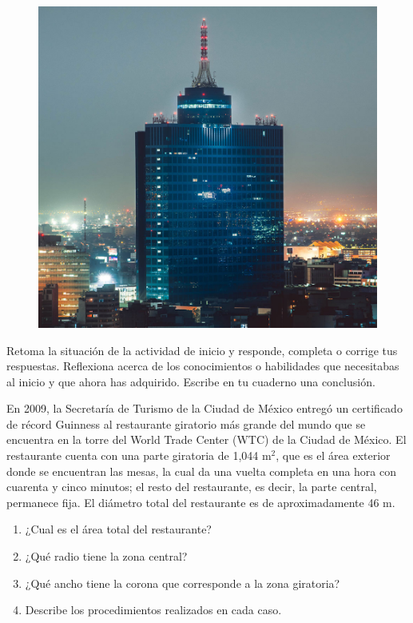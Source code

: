 \documentclass[11pt]{book}
\begin{document}
\begin{boxK}
  \begin{enumerate}
    \begin{minipage}[t]{0.25\textwidth}
      \begin{figure}[H]
        \centering
        \includegraphics[width=.8\linewidth]{wtc.jpg}
      \end{figure}
    \end{minipage}\hfill
    \begin{minipage}[t]{0.65\textwidth}
      \item Retoma la situación de la actividad de inicio y responde, completa o corrige tus respuestas. Reflexiona acerca de los conocimientos o habilidades que necesitabas al inicio y que ahora has adquirido. Escribe en tu cuaderno una conclusión.
      \item En 2009, la Secretaría de Turismo de la Ciudad de México entregó un certificado de récord Guinness al restaurante giratorio más grande del mundo que se encuentra en la torre del World Trade Center (WTC) de la Ciudad de México. El restaurante cuenta con una parte giratoria de 1,044 m$^2$, que es el área exterior donde se encuentran las mesas, la cual da una vuelta completa en una hora con cuarenta y cinco minutos; el resto del restaurante, es decir, la parte central, permanece fija. El diámetro total del restaurante es de aproximadamente 46 m.
    \end{minipage}
    \begin{enumerate}
      \item ¿Cual es el área total del restaurante?
      \item ¿Qué radio tiene la zona central?
      \item ¿Qué ancho tiene la corona que corresponde a la zona giratoria?
      \item Describe los procedimientos realizados en cada caso.
    \end{enumerate}
  \end{enumerate}
\end{boxK}
\end{document}
